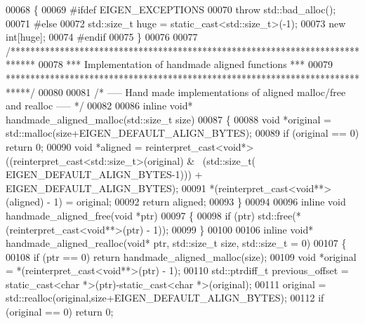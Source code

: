 \begin{DoxyCode}
{00068 \{
00069 \textcolor{preprocessor}{  #ifdef EIGEN\_EXCEPTIONS}
00070     \textcolor{keywordflow}{throw} std::bad\_alloc();
00071 \textcolor{preprocessor}{  #else}
00072     std::size\_t huge = \textcolor{keyword}{static\_cast<}std::size\_t\textcolor{keyword}{>}(-1);
00073     \textcolor{keyword}{new} \textcolor{keywordtype}{int}[huge];
00074 \textcolor{preprocessor}{  #endif}
00075 \}
00076 
00077 \textcolor{comment}{/*****************************************************************************}
00078 \textcolor{comment}{*** Implementation of handmade aligned functions                           ***}
00079 \textcolor{comment}{*****************************************************************************/}
00080 
00081 \textcolor{comment}{/* ----- Hand made implementations of aligned malloc/free and realloc ----- */}
00082 
00086 \textcolor{keyword}{inline} \textcolor{keywordtype}{void}* handmade\_aligned\_malloc(std::size\_t size)
00087 \{
00088   \textcolor{keywordtype}{void} *original = std::malloc(size+EIGEN\_DEFAULT\_ALIGN\_BYTES);
00089   \textcolor{keywordflow}{if} (original == 0) \textcolor{keywordflow}{return} 0;
00090   \textcolor{keywordtype}{void} *aligned = \textcolor{keyword}{reinterpret\_cast<}\textcolor{keywordtype}{void}*\textcolor{keyword}{>}((\textcolor{keyword}{reinterpret\_cast<}std::size\_t\textcolor{keyword}{>}(original) & ~(std::size\_t(
      EIGEN\_DEFAULT\_ALIGN\_BYTES-1))) + EIGEN\_DEFAULT\_ALIGN\_BYTES);
00091   *(\textcolor{keyword}{reinterpret\_cast<}\textcolor{keywordtype}{void}**\textcolor{keyword}{>}(aligned) - 1) = original;
00092   \textcolor{keywordflow}{return} aligned;
00093 \}
00094 
00096 \textcolor{keyword}{inline} \textcolor{keywordtype}{void} handmade\_aligned\_free(\textcolor{keywordtype}{void} *ptr)
00097 \{
00098   \textcolor{keywordflow}{if} (ptr) std::free(*(reinterpret\_cast<void**>(ptr) - 1));
00099 \}
00100 
00106 \textcolor{keyword}{inline} \textcolor{keywordtype}{void}* handmade\_aligned\_realloc(\textcolor{keywordtype}{void}* ptr, std::size\_t size, std::size\_t = 0)
00107 \{
00108   \textcolor{keywordflow}{if} (ptr == 0) \textcolor{keywordflow}{return} handmade\_aligned\_malloc(size);
00109   \textcolor{keywordtype}{void} *original = *(\textcolor{keyword}{reinterpret\_cast<}\textcolor{keywordtype}{void}**\textcolor{keyword}{>}(ptr) - 1);
00110   std::ptrdiff\_t previous\_offset = \textcolor{keyword}{static\_cast<}\textcolor{keywordtype}{char} *\textcolor{keyword}{>}(ptr)-static\_cast<char *>(original);
00111   original = std::realloc(original,size+EIGEN\_DEFAULT\_ALIGN\_BYTES);
00112   \textcolor{keywordflow}{if} (original == 0) \textcolor{keywordflow}{return} 0;
}
\end{DoxyCode}
